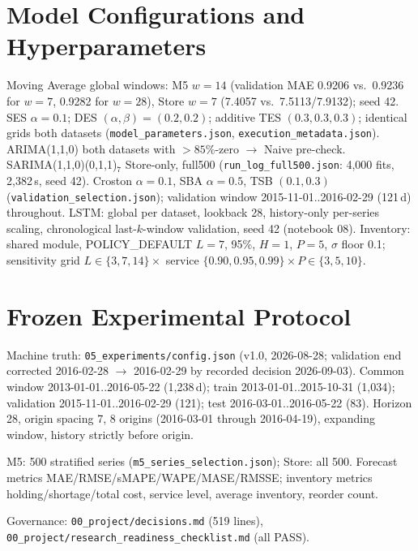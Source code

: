 \section{Model Configurations and Hyperparameters}
\label{app:configs}
Moving Average global windows: M5 $w=14$ (validation MAE 0.9206 vs.\ 0.9236
for $w=7$, 0.9282 for $w=28$), Store $w=7$ (7.4057 vs.\ 7.5113/7.9132); seed
42. SES $\alpha=0.1$; DES $(\alpha,\beta)=(0.2,0.2)$; additive TES
$(0.3,0.3,0.3)$; identical grids both datasets
(\texttt{model\_parameters.json}, \texttt{execution\_metadata.json}).
ARIMA(1,1,0) both datasets with $>85\%$-zero $\rightarrow$ Naive pre-check.
SARIMA(1,1,0)(0,1,1)$_7$ Store-only, full500
(\texttt{run\_log\_full500.json}: 4,000 fits, 2,382\,s, seed 42).
Croston $\alpha=0.1$, SBA $\alpha=0.5$, TSB $(0.1,0.3)$
(\texttt{validation\_selection.json}); validation window 2015-11-01..2016-02-29
(121\,d) throughout. LSTM: global per dataset, lookback 28, history-only
per-series scaling, chronological last-$k$-window validation, seed 42
(notebook 08). Inventory: shared module, POLICY\_DEFAULT $L=7$, 95\%,
$H=1$, $P=5$, $\sigma$ floor 0.1; sensitivity grid $L\in\{3,7,14\}\times$
service $\{0.90,0.95,0.99\}\times P\in\{3,5,10\}$.

\section{Frozen Experimental Protocol}
\label{app:protocol}
Machine truth: \texttt{05\_experiments/config.json} (v1.0, 2026-08-28;
validation end corrected 2016-02-28 $\rightarrow$ 2016-02-29 by recorded
decision 2026-09-03). Common window 2013-01-01..2016-05-22 (1,238\,d); train
2013-01-01..2015-10-31 (1,034); validation 2015-11-01..2016-02-29 (121);
test 2016-03-01..2016-05-22 (83). Horizon 28, origin spacing 7, 8 origins
(2016-03-01 through 2016-04-19), expanding window, history strictly before
origin. {\sloppy M5: 500 stratified series (\texttt{m5\_series\_selection.json});
Store: all 500. Forecast metrics MAE/RMSE/sMAPE/WAPE/MASE/RMSSE; inventory
metrics holding/shortage/total cost, service level, average inventory,
reorder count.\par} Governance: \texttt{00\_project/decisions.md} (519 lines),
\texttt{00\_project/research\_readiness\_checklist.md} (all PASS).
